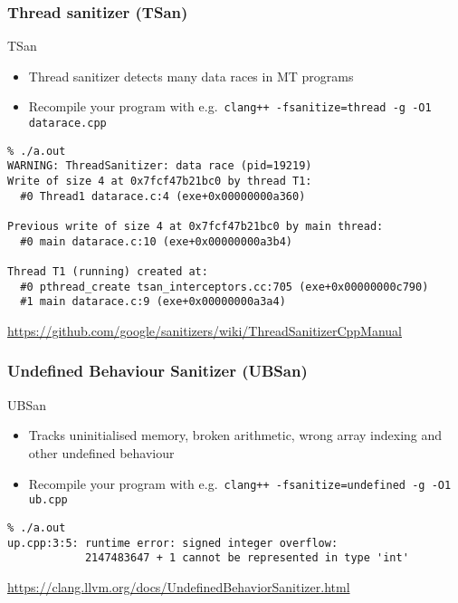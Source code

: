 \begin{frame}[fragile]
  \frametitle{Thread sanitizer (TSan)}
  \begin{block}{TSan}
    \begin{itemize}
      \item Thread sanitizer detects many data races in MT programs
      \item Recompile your program with e.g.\ \texttt{clang++ -fsanitize=thread -g -O1 datarace.cpp}
    \end{itemize}
  \end{block}

  \footnotesize
  \begin{verbatim}
% ./a.out
WARNING: ThreadSanitizer: data race (pid=19219)
Write of size 4 at 0x7fcf47b21bc0 by thread T1:
  #0 Thread1 datarace.c:4 (exe+0x00000000a360)

Previous write of size 4 at 0x7fcf47b21bc0 by main thread:
  #0 main datarace.c:10 (exe+0x00000000a3b4)

Thread T1 (running) created at:
  #0 pthread_create tsan_interceptors.cc:705 (exe+0x00000000c790)
  #1 main datarace.c:9 (exe+0x00000000a3a4)
  \end{verbatim}

  \begin{block}{}
    \scriptsize
    \url{https://github.com/google/sanitizers/wiki/ThreadSanitizerCppManual}
  \end{block}
\end{frame}

\begin{frame}[fragile]
  \frametitle{Undefined Behaviour Sanitizer (UBSan)}
  \begin{block}{UBSan}
    \begin{itemize}
      \item Tracks uninitialised memory, broken arithmetic, wrong array indexing and other undefined behaviour
      \item Recompile your program with e.g.\ \texttt{clang++ -fsanitize=undefined -g -O1 ub.cpp}
    \end{itemize}
  \end{block}
  \small
  \begin{verbatim}
% ./a.out
up.cpp:3:5: runtime error: signed integer overflow:
            2147483647 + 1 cannot be represented in type 'int'
  \end{verbatim}
  \begin{block}{}
    \footnotesize
    \url{https://clang.llvm.org/docs/UndefinedBehaviorSanitizer.html}
  \end{block}
\end{frame}


